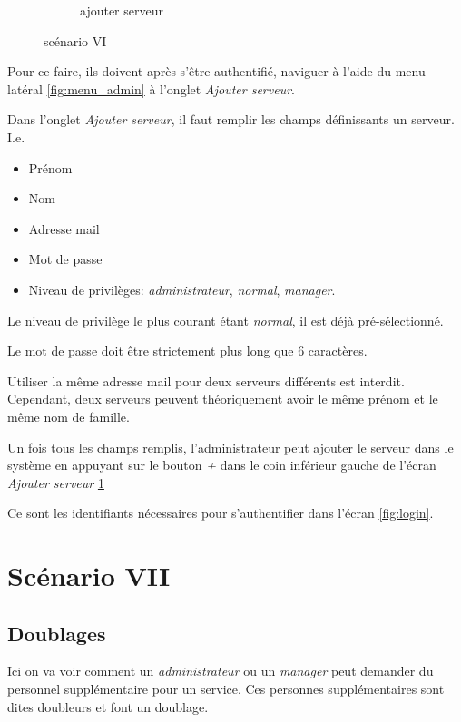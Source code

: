 \begin{figure}[!h]
\begin{subfigure}{.45\textwidth}
            \caption{ajouter serveur}
            \label{fig:ajout_serveur}
        \end{subfigure}
        \caption{scénario VI}
        \label{fig:scen06}
    \end{figure}

    Pour ce faire, ils doivent après s'être authentifié, naviguer à l'aide 
    du menu latéral \ref{fig:menu_admin} à l'onglet \textit{Ajouter serveur}.

    Dans l'onglet \textit{Ajouter serveur}, il faut remplir les champs définissants un serveur. I.e. 
    \smallskip
    \begin{itemize}
        \item Prénom
        \item Nom 
        \item Adresse mail
        \item Mot de passe
        \item Niveau de privilèges: \textit{administrateur}, \textit{normal}, \textit{manager}. 
    \end{itemize}
    \medskip
    Le niveau de privilège le plus courant étant \textit{normal}, il est déjà 
    pré-sélectionné.

    Le mot de passe doit être strictement plus long que 6 caractères.

    Utiliser la même adresse mail pour deux serveurs différents est interdit. 
    Cependant, deux serveurs peuvent théoriquement avoir le même prénom et le même nom de 
    famille.

    Un fois tous les champs remplis, l'administrateur peut ajouter le serveur
    dans le système en appuyant sur le bouton \textit{+} dans le coin inférieur
    gauche de l'écran \textit{Ajouter serveur} \ref{fig:ajout_serveur}

    Ce sont les identifiants nécessaires pour s'authentifier dans l'écran \ref{fig:login}.
    \section[Doublages - Scénario VII]{Scénario VII}
        \subsection*{Doublages}
        Ici on va voir comment un \textit{administrateur} ou un \textit{manager} peut demander
        du personnel supplémentaire pour un service. Ces personnes supplémentaires sont dites 
        doubleurs et font un doublage.

